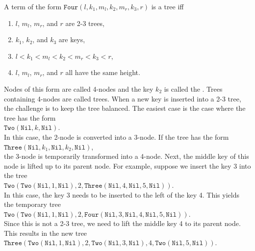 A term of the form $\texttt{Four}(l,k_1,m_l, k_2, m_r, k_3, r)$ is a  tree iff
\begin{enumerate}
\item $l$, $m_l$, $m_r$, and $r$ are 2-3 trees,
\item $k_1$, $k_2$, and $k_3$ are keys,
\item $l < k_1 < m_l < k_2 < m_r < k_3 < r$,
\item $l$, $m_l$, $m_r$, and $r$ all have the same height.
\end{enumerate}
Nodes of this form are called 4-nodes and the key $k_2$ is called the .
Trees containing 4-nodes are called  trees.
When a new key is inserted into a 2-3 tree, the challenge is to keep the tree balanced.  The easiest
case is the case where the tree has the form
\\[0.2cm]
\hspace*{1.3cm}
$\texttt{Two}(\texttt{Nil}, k, \texttt{Nil})$.
\\[0.2cm]
In this case, the 2-node is converted into a 3-node.  If the tree has the form 
\\[0.2cm]
\hspace*{1.3cm}
$\texttt{Three}(\texttt{Nil}, k_1, \texttt{Nil}, k_2, \texttt{Nil})$,
\\[0.2cm]
the 3-node is temporarily transformed into a 4-node.  Next, the middle key of this node is lifted up
to its parent node.  For example, suppose we insert the key 3 into the tree
\\[0.2cm]
\hspace*{1.3cm}
$\texttt{Two}(\texttt{Two}(\texttt{Nil}, 1, \texttt{Nil}), 2, \texttt{Three}(\texttt{Nil}, 4, \texttt{Nil}, 5, \texttt{Nil}))$.
\\[0.2cm]
In this case, the key 3 needs to be inserted to the left of the key 4.  This yields the temporary tree 
\\[0.2cm]
\hspace*{1.3cm}
$\texttt{Two}(\texttt{Two}(\texttt{Nil}, 1, \texttt{Nil}), 2, \texttt{Four}(\texttt{Nil}, 3, \texttt{Nil}, 4, \texttt{Nil}, 5, \texttt{Nil}))$.
\\[0.2cm]
Since this is not a 2-3 tree, we need to lift the middle key 4 to its parent node.  This results in
the new tree
\\[-0.1cm]
\hspace*{1.3cm}
$\texttt{Three}(\texttt{Two}(\texttt{Nil}, 1, \texttt{Nil}), 2, \texttt{Two}(\texttt{Nil}, 3, \texttt{Nil}), 4, \texttt{Two}(\texttt{Nil}, 5, \texttt{Nil}))$.
